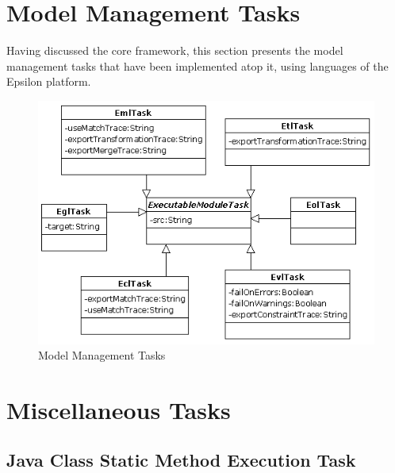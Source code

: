 


\section{Model Management Tasks}
\label{sec:Workflow.ModelManagementTasks}
  
Having discussed the core framework, this section presents the model management tasks that have been implemented atop it, using languages of the Epsilon platform.

\begin{figure}[ht!]
	\centering
		\includegraphics{images/Tasks.png}
	\caption{Model Management Tasks}
	\label{fig:Tasks}
\end{figure}










\section{Miscellaneous Tasks}

\subsection{Java Class Static Method Execution Task}

